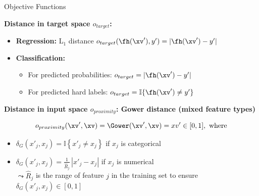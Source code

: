\documentclass[11pt,compress,t,notes=noshow, aspectratio=169, xcolor=table, usenames,dvipsnames]{beamer}
\begin{document}
\begin{frame}{Objective Functions }

\textbf{Distance in target space $o_{target}$:}

\begin{itemize}
  \item \textbf{Regression:} L$_1$ distance   
  $o_{target}(\fh(\xv'), y') = | \fh(\xv') - y'|$
  
  \item \textbf{Classification:}  
  \begin{itemize}
    \item For predicted probabilities: $o_{target} = | \fh(\xv') - y'|$
    \item For predicted hard labels: $o_{target} = \mathbb{I} \{ \fh(\xv') \ne y'\}$
  \end{itemize}
\end{itemize}

\pause

\textbf{Distance in input space $o_{proximity}$: Gower distance (mixed feature types)}

\[
o_{proximity}(\xv', \xv) = \Gower(\xv', \xv) = xv' \in [0, 1], \text{ where}
\]


\begin{itemize}
  \item $\delta_G(x'_j, x_j) = \mathbb{I} \left\{ x'_j \ne x_j \right\}$ if $x_j$ is categorical
  \item $\delta_G(x'_j, x_j) = \frac{1}{\widehat{R}_j} \, |x'_j - x_j| $ if $x_j$ is numerical\\
  $\leadsto \widehat{R}_j$ is the range of feature $j$ in the training set to ensure $\delta_G(x'_j, x_j) \in [0, 1]$
\end{itemize}

\end{frame}


	
\end{document}
